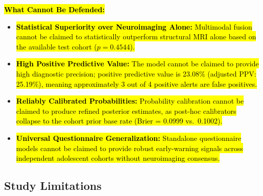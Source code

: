 \documentclass[10pt,letterpaper]{article}
\begin{document}
\hl{\textbf{What Cannot Be Defended:}}
\begin{itemize}
    \item \hl{\textbf{Statistical Superiority over Neuroimaging Alone:} Multimodal fusion cannot be claimed to statistically outperform structural MRI alone based on the available test cohort ($p = 0.4544$).}
    \item \hl{\textbf{High Positive Predictive Value:} The model cannot be claimed to provide high diagnostic precision; positive predictive value is 23.08\% (adjusted PPV: 25.19\%), meaning approximately 3 out of 4 positive alerts are false positives.}
    \item \hl{\textbf{Reliably Calibrated Probabilities:} Probability calibration cannot be claimed to produce refined posterior estimates, as post-hoc calibrators collapse to the cohort prior base rate (Brier = 0.0999 vs.\ 0.1002).}
    \item \hl{\textbf{Universal Questionnaire Generalization:} Standalone questionnaire models cannot be claimed to provide robust early-warning signals across independent adolescent cohorts without neuroimaging consensus.}
\end{itemize}

\subsection*{Study Limitations}
\end{document}
